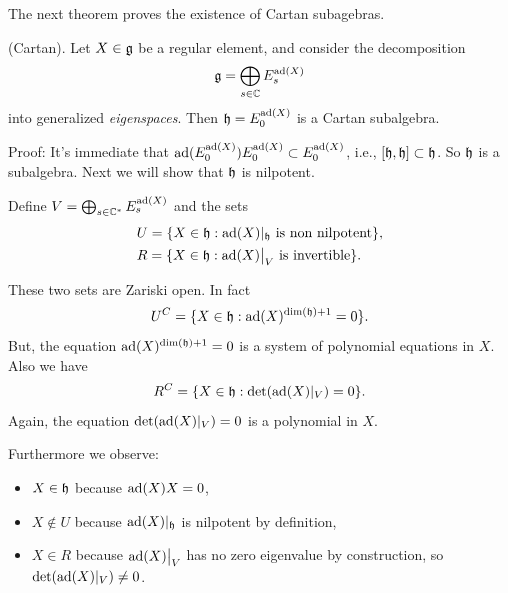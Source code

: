 The next theorem proves the existence of Cartan subagebras.


\begin{dang}
    \begin{theorem}
        (Cartan).
        Let $X\in\mathfrak{g}$ be a regular element, and consider the decomposition
        \begin{equation}
            \mathfrak{g}=\bigoplus_{s\in\mathbb{C}}E_s^{\text{ad}(X)}
        \end{equation}
        into generalized \textit{eigenspaces}. Then $\mathfrak{h}=E_0^{\text{ad}(X)}$ is a Cartan subalgebra.
    \end{theorem}
\end{dang}
Proof: It's immediate that $\text{ad}(E_0^{\text{ad}(X)})E_0^{\text{ad}(X)}\subset E_0^{\text{ad}(X)}$, i.e., $[\mathfrak{h},\mathfrak{h}]\subset\mathfrak{h}$. So 
$\mathfrak{h}$ is a subalgebra. Next we will show that $\mathfrak{h}$ is nilpotent. \par

Define $V=\bigoplus_{s\in\mathbb{C}^*}E_s^{\text{ad}(X)}$ and the sets
\begin{equation}
    \begin{split}
        &U=\{X\in\mathfrak{h}:\text{ad}(X)|_{\mathfrak{h}} \text{ is non nilpotent}\},\\
        &R=\{X\in\mathfrak{h}:\text{ad}(X)\big|_V \text{ is invertible}\}.
    \end{split}
\end{equation}

These two sets are Zariski open. In fact 
\begin{equation}
    U^C = \{X\in\mathfrak{h}: \text{ad}(X)^{\dim(\mathfrak{h})+1}=0\}.
\end{equation}
But, the equation $\text{ad}(X)^{\dim(\mathfrak{h})+1}=0$ is a system of polynomial equations in $X$. Also we have 
\begin{equation}
    R^C=\{X\in\mathfrak{h}: \det(\text{ad}(X)|_V)=0\}.
\end{equation}
Again, the equation $\det(\text{ad}(X)|_V)=0$ is a polynomial in $X$.\par 

Furthermore we observe:
\begin{itemize}
    \item $X\in\mathfrak{h}$ because $\text{ad}(X)X=0$,
    \item $X\notin U$ because $\text{ad}(X)|_{\mathfrak{h}}$ is nilpotent by definition, 
    \item $X\in R$ because $\text{ad}(X)\big|_V$ has no zero eigenvalue by construction, so $\det(\text{ad}(X)|_V)\neq0$.
\end{itemize}

